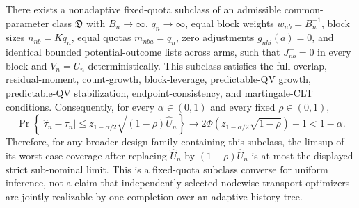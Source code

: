There exists a nonadaptive fixed-quota subclass of an admissible common-parameter class \(\mathfrak D\) with \(B_n\to\infty\), \(q_n\to\infty\), equal block weights \(w_{nb}=B_n^{-1}\), block sizes \(n_{nb}=Kq_n\), equal quotas \(m_{nba}=q_n\), zero adjustments \(g_{nbi}(a)=0\), and identical bounded potential-outcome lists across arms, such that \(J_{nb}^{-}=0\) in every block and \(V_n=U_n\) deterministically. This subclass satisfies the full overlap, residual-moment, count-growth, block-leverage, predictable-QV growth, predictable-QV stabilization, endpoint-consistency, and martingale-CLT conditions. Consequently, for every \(\alpha\in(0,1)\) and every fixed \(\rho\in(0,1)\),
\[
 \Pr\!\left\{|\widehat\tau_n-\tau_n|\le z_{1-\alpha/2}
 \sqrt{(1-\rho)\widehat U_n}\right\}
 \longrightarrow
 2\Phi\!\left(z_{1-\alpha/2}\sqrt{1-\rho}\right)-1
 <1-\alpha.
\]
Therefore, for any broader design family containing this subclass, the limsup of its worst-case coverage after replacing \(\widehat U_n\) by \((1-\rho)\widehat U_n\) is at most the displayed strict sub-nominal limit. This is a fixed-quota subclass converse for uniform inference, not a claim that independently selected nodewise transport optimizers are jointly realizable by one completion over an adaptive history tree.